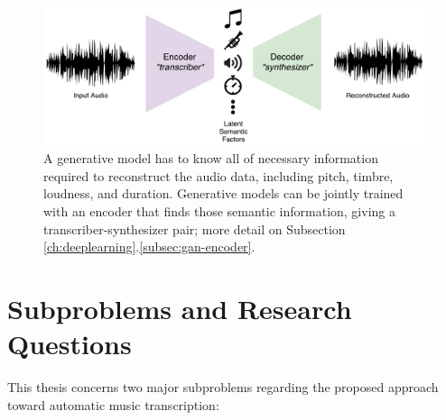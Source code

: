 \begin{figure}[t]
	\includegraphics[width=\textwidth]{autoencoder.pdf}
	\caption{A generative model has to know all of necessary information required to reconstruct the audio data, including pitch, timbre, loudness, and duration. Generative models can be jointly trained with an encoder that finds those semantic information, giving a transcriber-synthesizer pair; more detail on Subsection \ref{ch:deeplearning}.\ref{subsec:gan-encoder}.}
	\label{fig:autoencoder}
\end{figure}

\pagebreak

\section{Subproblems and Research Questions}\label{sec:subproblems}

This thesis concerns two major subproblems regarding the proposed approach toward automatic music transcription: 

\vspace{1em}


